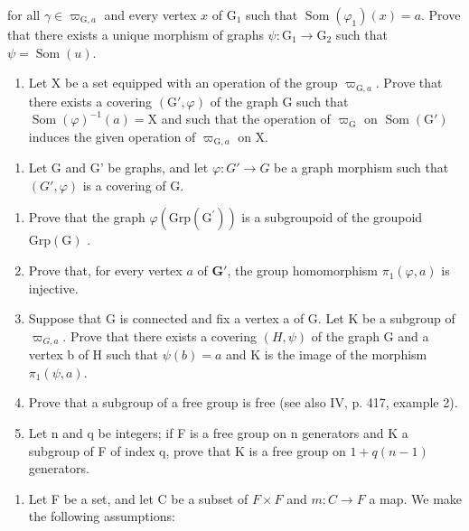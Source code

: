 for all \(\gamma \in \varpi_{\mathrm{G},a}\) and every vertex \(x\) of \(\mathrm{G}_1\) such that \(\operatorname{Som}(\varphi_1)(x) = a\). Prove that there exists a unique morphism of graphs \(\psi: \mathrm{G}_1 \to \mathrm{G}_2\) such that \(\psi = \operatorname{Som}(u)\).

\begin{enumerate}
\def\labelenumi{\alph{enumi})}
\setcounter{enumi}{1}
\tightlist
\item
  Let X be a set equipped with an operation of the group \(\varpi_{\mathrm{G},a}\). Prove that there exists a covering \((\mathrm{G}',\varphi)\) of the graph G such that \(\operatorname{Som}(\varphi)^{-1}(a) = \mathrm{X}\) and such that the operation of \(\varpi_{\mathrm{G}}\) on \(\operatorname{Som}(\mathrm{G}')\) induces the given operation of \(\varpi_{\mathrm{G},a}\) on X.
\end{enumerate}

\begin{enumerate}
\def\labelenumi{\arabic{enumi})}
\setcounter{enumi}{8}
\tightlist
\item
  Let G and G' be graphs, and let \(\varphi\colon G'\to G\) be a graph morphism such that \((G',\varphi)\) is a covering of G.
\end{enumerate}

\begin{enumerate}
\def\labelenumi{\alph{enumi})}
\item
  Prove that the graph \(\varphi(\mathrm{Grp}(\mathrm{G}^{\prime}))\) is a subgroupoid of the groupoid \(\mathrm{Grp}(\mathrm{G})\) .
\item
  Prove that, for every vertex \(a\) of \(\mathbf{G}'\), the group homomorphism \(\pi_1(\varphi, a)\) is injective.
\item
  Suppose that G is connected and fix a vertex a of G. Let K be a subgroup of \(\varpi_{G,a}\). Prove that there exists a covering \((H,\psi)\) of the graph G and a vertex b of H such that \(\psi(b)=a\) and K is the image of the morphism \(\pi_{1}(\psi,a)\).
\item
  Prove that a subgroup of a free group is free (see also IV, p. 417, example 2).
\item
  Let n and q be integers; if F is a free group on n generators and K a subgroup of F of index q, prove that K is a free group on \(1 + q(n - 1)\) generators.
\end{enumerate}

\begin{enumerate}
\def\labelenumi{\arabic{enumi})}
\setcounter{enumi}{9}
\tightlist
\item
  Let F be a set, and let C be a subset of \(F \times F\) and \(m: C \to F\) a map. We make the following assumptions:
\end{enumerate}

